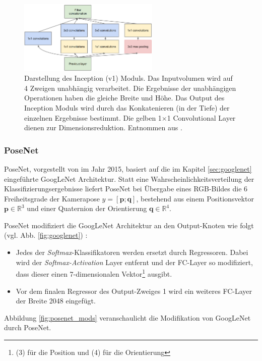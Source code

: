  \begin{figure}
	\centering
	\includegraphics[width=0.60\textwidth]{images/googlenet/inception_module.png}
	\caption{Darstellung des Inception (v1) Moduls. Das Inputvolumen wird auf 4 Zweigen unabhängig verarbeitet. Die Ergebnisse der unabhängigen Operationen haben die gleiche Breite und Höhe. Das Output des Inception Moduls wird durch das Konkatenieren (in der Tiefe) der einzelnen Ergebnisse bestimmt. Die gelben 1$\times$1 Convolutional Layer dienen zur Dimensionsreduktion. Entnommen aus \cite{szegedyGoingDeeperConvolutions2015}.}
	\label{fig:inception_module}
\end{figure}

\subsubsection{PoseNet}
\label{sec:posenet}
PoseNet, vorgestellt von \citet{kendallPoseNetConvolutionalNetwork2015} im Jahr 2015, basiert auf die im Kapitel \ref{sec:googlenet} eingeführte GoogLeNet Architektur. Statt eine Wahrscheinlichkeitsverteilung der Klassifizierungsergebnisse liefert PoseNet bei Übergabe eines RGB-Bildes die 6 Freiheitsgrade der Kamerapose $y = [\pmb{p};\pmb{q}]$, bestehend aus einem Positionsvektor $\pmb{p} \in \mathbb{R}^{3}$ und einer Quaternion der Orientierung $ \pmb{q} \in \mathbb{R}^{4}$.

PoseNet modifiziert die GoogLeNet Architektur an den Output-Knoten wie folgt (vgl. Abb. \ref{fig:googlenet}) \cite{kendallPoseNetConvolutionalNetwork2015}:
\begin{itemize}
	\item Jedes der \textit{Softmax}-Klassifikatoren werden ersetzt durch Regressoren. Dabei wird der \textit{Softmax-Activation} Layer entfernt und der FC-Layer so modifiziert, dass dieser einen 7-dimensionalen Vektor\footnote{(3) für die Position und (4) für die Orientierung} ausgibt.
	\item Vor dem finalen Regressor des Output-Zweiges 1 wird ein weiteres FC-Layer der Breite 2048 eingefügt.

\end{itemize}
Abbildung \ref{fig:posenet_mods} veranschaulicht die Modifikation von GoogLeNet durch PoseNet.

